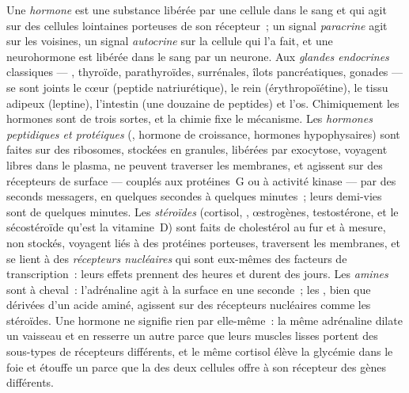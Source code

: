 \begin{definition}[L'hormone]\label{def:b3:endocrinology:hormone}
Une \emph{hormone} est une substance libérée par une cellule dans le
sang et qui agit sur des cellules lointaines porteuses de son
récepteur~; un signal \emph{paracrine} agit sur les voisines, un signal
\emph{autocrine} sur la cellule qui l'a fait, et une neurohormone est
libérée dans le sang par un neurone. Aux \emph{glandes endocrines}
classiques --- , thyroïde, parathyroïdes, surrénales, îlots
pancréatiques, gonades --- se sont joints le cœur (peptide
natriurétique), le rein (érythropoïétine), le tissu adipeux (leptine),
l'intestin (une douzaine de peptides) et l'os. Chimiquement les hormones
sont de trois sortes, et la chimie fixe le mécanisme. Les \emph{hormones
peptidiques et protéiques} (, hormone de croissance, hormones
hypophysaires) sont faites sur des ribosomes, stockées en granules,
libérées par exocytose, voyagent libres dans le plasma, ne peuvent
traverser les membranes, et agissent sur des récepteurs de surface ---
couplés aux protéines~G ou à activité kinase --- par des seconds
messagers, en quelques secondes à quelques minutes~; leurs demi-vies
sont de quelques minutes. Les \emph{stéroïdes} (cortisol, ,
œstrogènes, testostérone, et le sécostéroïde qu'est la vitamine~D) sont
faits de cholestérol au fur et à mesure, non stockés, voyagent liés à
des protéines porteuses, traversent les membranes, et se lient à des
\emph{récepteurs nucléaires} qui sont eux-mêmes des facteurs de
transcription~: leurs effets prennent des heures et durent des jours.
Les \emph{amines} sont à cheval~: l'adrénaline agit à la surface en une
seconde~; les , bien que dérivées d'un acide
aminé, agissent sur des récepteurs nucléaires comme les stéroïdes. Une
hormone ne signifie rien par elle-même~: la même adrénaline dilate un
vaisseau et en resserre un autre parce que leurs muscles lisses portent
des sous-types de récepteurs différents, et le même cortisol élève la
glycémie dans le foie et étouffe un  parce que la 
des deux cellules offre à son récepteur des gènes différents.
\end{definition}

